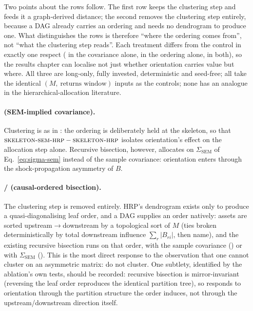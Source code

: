 Two points about the rows follow. The first row keeps the clustering step
and feeds
it a graph-derived distance; the second removes the clustering step
entirely, because a DAG already carries an ordering and needs no dendrogram
to produce one. What distinguishes the rows is therefore ``where the
ordering comes from'', not
``what the clustering step reads''. Each treatment differs from the
control in exactly one respect (\skelsem{} in the covariance alone,
\orientsamp{} in the
ordering alone, \orientsem{} in both), so the results chapter can localise
not just
whether orientation carries value but where. All three are long-only,
fully invested, deterministic and seed-free; all take the identical
$(M,\ \text{returns window})$ inputs as the controls; none has an analogue in
the hierarchical-allocation literature.

\paragraph{\skelsem{} (SEM-implied covariance).} Clustering is as in
\skelsamp{}: the
ordering is deliberately held at the skeleton, so that
$\textsc{skeleton-sem-hrp}{}-\textsc{skeleton-hrp}{}$ isolates orientation's effect on the allocation
step
alone. Recursive bisection, however, allocates on $\Sigma_{\mathrm{SEM}}$
of
Eq.~\eqref{eq:sigma-sem} instead of the sample covariance: orientation
enters through the shock-propagation asymmetry of $B$.

\paragraph{\orientsamp{} / \orientsem{} (causal-ordered bisection).}
\label{sec:d2}
The clustering step is removed entirely. HRP's dendrogram exists only to
produce a quasi-diagonalising leaf order, and a DAG supplies an order
natively: assets are sorted upstream$\to$downstream by a topological sort
of
$M$ (ties broken deterministically by total downstream influence
$\sum_r |B_{ri}|$, then name), and the existing recursive bisection
runs on that order, with the sample covariance (\orientsamp{}) or with
$\Sigma_{\mathrm{SEM}}$ (\orientsem{}). This is the most direct response
to the
observation that one cannot cluster on an asymmetric matrix: do not
cluster.
One subtlety, identified by the ablation's own tests, should be recorded:
recursive bisection is mirror-invariant (reversing the leaf order
reproduces the identical partition tree), so \orientsamp{} responds to
orientation
through the partition structure the order induces, not through the
upstream/downstream direction itself.

